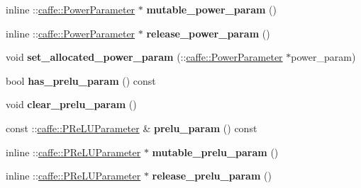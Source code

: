 \begin{DoxyCompactItemize}
\mbox{\label{classcaffe_1_1_layer_parameter_a9c33e42cdfb1436d70f53bb30d179937}} 
inline \+::\mbox{\hyperlink{classcaffe_1_1_power_parameter}{caffe\+::\+Power\+Parameter}} $\ast$ {\bfseries mutable\+\_\+power\+\_\+param} ()
\item 
\mbox{\label{classcaffe_1_1_layer_parameter_a13c8da9d45a966d15101eb2592b27d5b}} 
inline \+::\mbox{\hyperlink{classcaffe_1_1_power_parameter}{caffe\+::\+Power\+Parameter}} $\ast$ {\bfseries release\+\_\+power\+\_\+param} ()
\item 
\mbox{\label{classcaffe_1_1_layer_parameter_ad7ffedf703a12380a55cb384617fdde2}} 
void {\bfseries set\+\_\+allocated\+\_\+power\+\_\+param} (\+::\mbox{\hyperlink{classcaffe_1_1_power_parameter}{caffe\+::\+Power\+Parameter}} $\ast$power\+\_\+param)
\item 
\mbox{\label{classcaffe_1_1_layer_parameter_a5b75274e94967ccef8e96b78a96899c4}} 
bool {\bfseries has\+\_\+prelu\+\_\+param} () const
\item 
\mbox{\label{classcaffe_1_1_layer_parameter_af536abc88a277ffd709ec0c48ef2faf6}} 
void {\bfseries clear\+\_\+prelu\+\_\+param} ()
\item 
\mbox{\label{classcaffe_1_1_layer_parameter_a56dce27f323aafc2a33c83cbac9cff9d}} 
const \+::\mbox{\hyperlink{classcaffe_1_1_p_re_l_u_parameter}{caffe\+::\+P\+Re\+L\+U\+Parameter}} \& {\bfseries prelu\+\_\+param} () const
\item 
\mbox{\label{classcaffe_1_1_layer_parameter_a0b3aecf3036fb4c908e9f7b9fa66424c}} 
inline \+::\mbox{\hyperlink{classcaffe_1_1_p_re_l_u_parameter}{caffe\+::\+P\+Re\+L\+U\+Parameter}} $\ast$ {\bfseries mutable\+\_\+prelu\+\_\+param} ()
\item 
\mbox{\label{classcaffe_1_1_layer_parameter_a680388630ae5ff651c552032f1898d00}} 
inline \+::\mbox{\hyperlink{classcaffe_1_1_p_re_l_u_parameter}{caffe\+::\+P\+Re\+L\+U\+Parameter}} $\ast$ {\bfseries release\+\_\+prelu\+\_\+param} ()
\item 

\end{DoxyCompactItemize}
